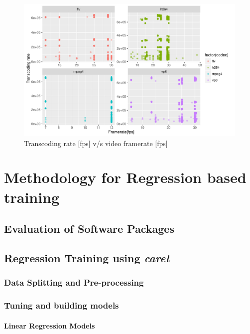 \documentclass[letterpaper,12pt,titlepage,oneside,final]{report}
\begin{document}
        \begin{figure}[!h]
            \centering
            \includegraphics[width=\textwidth]{framerate_vs_trate}
            \caption{Transcoding rate [fps] v/s video framerate [fps]}
            \label{framerate_vs_trate}
        \end{figure}
    \clearpage

    \section {Methodology for Regression based training}

        \subsection {Evaluation of Software Packages}

        \subsection {Regression Training using \textit{caret}}

            \subsubsection{Data Splitting and Pre-processing}

            \subsubsection{Tuning and building models}

                \paragraph {Linear Regression Models}
\end{document}

